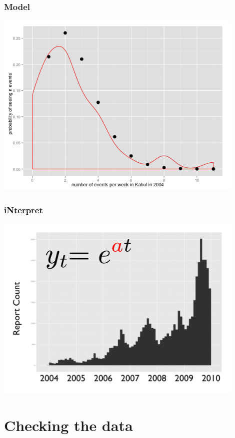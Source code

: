 \documentclass[xcolor=dvipsnames, 9pt]{beamer}
\begin{document}
\begin{frame}
    \frametitle{Model}
    \begin{center}
    \includegraphics[width=0.9\textwidth]{density_estimate.png}
    \end{center}
\end{frame}

\begin{frame}
    \frametitle{iNterpret}
    \begin{center}
    \includegraphics[width=0.9\textwidth]{time_course_model.png}
    \end{center}
\end{frame}

\section{Checking the data} %
\label{sec:checking_the_data}
\end{document}
